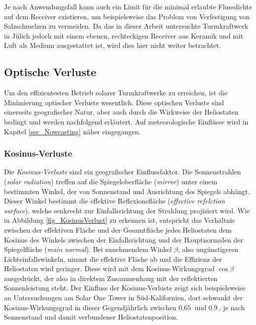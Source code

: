 Je nach Anwendungsfall kann auch ein Limit für die minimal erlaubte Flussdichte auf dem Receiver existieren, um beispielsweise das Problem von Verfestigung von Salzschmelzen zu vermeiden.
Da das in dieser Arbeit untersuchte Turmkraftwerk in Jülich jedoch mit einem ebenen, rechteckigen Receiver aus Keramik und mit Luft als Medium ausgestattet ist, wird dies hier nicht weiter betrachtet.

\subsection{Optische Verluste} \label{subsec_OptischeVerluste}
Um den effizientesten Betrieb solarer Turmkraftwerke zu erreichen, ist die Minimierung optischer Verluste wesentlich.
Diese optischen Verluste sind einerseits geografischer Natur, aber auch durch die Wirkweise der Heliostaten bedingt und werden nachfolgend erläutert.
Auf meteorologische Einflüsse wird in Kapitel \ref{sec_Nowcasting} näher eingegangen.

\subsubsection*{Kosinus-Verluste} \label{subsubsec_KosinusVerluste}
Die \textit{Kosinus-Verluste} sind ein geografischer Einflussfaktor.
Die Sonnenstrahlen (\textit{solar radiation}) treffen auf die Spiegeloberfläche (\textit{mirror}) unter einem bestimmten Winkel, der von Sonnenstand und Ausrichtung des Spiegels abhängt.
Dieser Winkel bestimmt die effektive Reflexionsfläche (\textit{effective refelction surface}), welche senkrecht zur Einfallsrichtung der Strahlung projiziert wird.
Wie in Abbildung \ref{fig_KosinusVerlust} zu erkennen ist, entspricht das Verhältnis zwischen der effektiven Fläche und der Gesamtfläche jedes Heliostaten dem Kosinus des Winkels zwischen der Einfallsrichtung und der Hauptnormalen der Spiegelfläche (\textit{main normal}).
Bei zunehmendem Winkel $\beta$, also ungünstigeren Lichteinfallswinkeln, nimmt die effektive Fläche ab und die Effizienz der Heliostaten wird geringer.
Diese wird mit dem Kosinus-Wirkungsgrad $\cos\beta$ ausgedrückt, der also in direktem Zusammenhang mit der reflektierten Sonnenleistung steht.
Der Einfluss der Kosinus-Verluste zeigt sich beispielsweise an Untersuchungen am Solar One Tower in Süd-Kalifornien, dort schwankt der Kosinus-Wirkungsgrad in dieser Gegend\linebreak jährlich zwischen $\SI{0.65}{}$ und $\SI{0.9}{}$, je nach Sonnenstand und damit verbundener Heliostatenposition. \cite{Holl}

